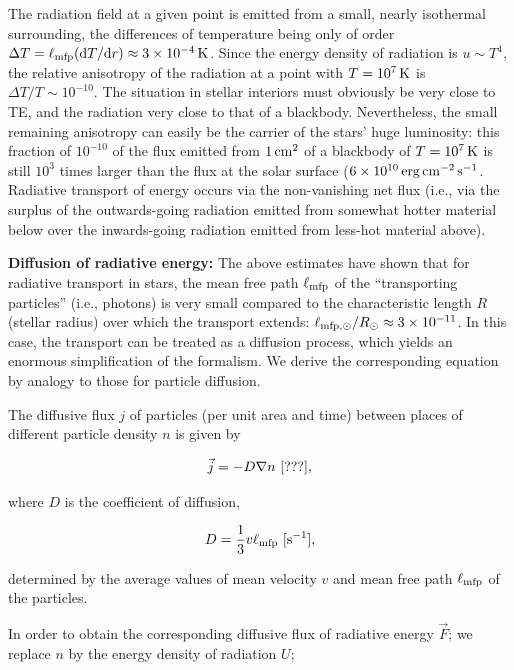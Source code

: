 \documentclass[a4paper,10pt]{article}
\begin{document}
{\noindent}The radiation field at a given point is emitted from a small, nearly isothermal surrounding, the differences of temperature being only of order $\Delta T=\ell_{\rm mfp}({\rm d}T/{\rm d}r)\approx3\times10^{-4}\,{\rm K}$. Since the energy density of radiation is $u\sim T^4$, the relative anisotropy of the radiation at a point with $T=10^7\,{\rm K}$ is $\Delta T/T\sim10^{-10}$. The situation in stellar interiors must obviously be very close to TE, and the radiation very close to that of a blackbody. Nevertheless, the small remaining anisotropy can easily be the carrier of the stars' huge luminosity: this fraction of $10^{-10}$ of the flux emitted from ${\rm 1\,cm^2}$ of a blackbody of $T=10^7\,{\rm K}$ is still $10^3$ times larger than the flux at the solar surface ($6\times10^{10}\,{\rm erg\,cm^{-2}\,s^{-1}}$. Radiative transport of energy occurs via the non-vanishing net flux (i.e., via the surplus of the outwards-going radiation emitted from somewhat hotter material below over the inwards-going radiation emitted from less-hot material above).

{\noindent}\textbf{Diffusion of radiative energy:} The above estimates have shown that for radiative transport in stars, the mean free path $\ell_{\rm mfp}$ of the ``transporting particles'' (i.e., photons) is very small compared to the characteristic length $R$ (stellar radius) over which the transport extends: $\ell_{\rm mfp,\odot}/R_\odot\approx3\times10^{-11}$. In this case, the transport can be treated as a diffusion process, which yields an enormous simplification of the formalism. We derive the corresponding equation by analogy to those for particle diffusion.

{\noindent}The diffusive flux $j$ of particles (per unit area and time) between places of different particle density $n$ is given by

\begin{align*}
    \vec{j} = -D\nabla n ~ [{\rm ???}],
\end{align*}

{\noindent}where $D$ is the coefficient of diffusion,

\begin{align*}
    D = \frac{1}{3}v\ell_{\rm mfp} ~ [{\rm s^{-1}}],
\end{align*}

{\noindent}determined by the average values of mean velocity $v$ and mean free path $\ell_{\rm mfp}$ of the particles.

{\noindent}In order to obtain the corresponding diffusive flux of radiative energy $\vec{F}$; we replace $n$ by the energy density of radiation $U$;
\end{document}
